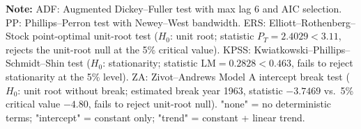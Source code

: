 \noindent\footnotesize\textbf{Note:} ADF: Augmented Dickey--Fuller test with max lag 6 and AIC selection. PP: Phillips--Perron test with Newey--West bandwidth. ERS: Elliott--Rothenberg--Stock point-optimal unit-root test ($H_0$: unit root; statistic $P_T = 2.4029 < 3.11$, rejects the unit-root null at the 5\% critical value). KPSS: Kwiatkowski--Phillips--Schmidt--Shin test ($H_0$: stationarity; statistic $\text{LM} = 0.2828 < 0.463$, fails to reject stationarity at the 5\% level). ZA: Zivot--Andrews Model A intercept break test ($H_0$: unit root without break; estimated break year 1963, statistic $-3.7469$ vs.\ 5\% critical value $-4.80$, fails to reject unit-root null). "none" = no deterministic terms; "intercept" = constant only; "trend" = constant + linear trend.